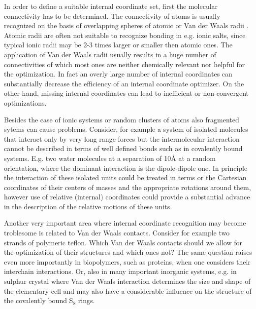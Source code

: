 \documentclass[prl,aps,preprint,superbib,12pt]{revtex4}
\begin{document}
In order to define a suitable internal coordinate set, first
the molecular connectivity has to be determined.
The connectivity of atoms is usually recognized on the basis of 
overlapping spheres of atomic or Van der Waals radii 
\cite{VBakken02,TBucko05,KNemeth04}. Atomic radii are often not suitable
to recognize bonding in e.g. ionic salts, since typical ionic radii
may be 2-3 times larger or smaller then atomic ones. The application
of Van der Waals radii usually results in a huge number of 
connectivities of which most ones are neither chemically relevant nor 
helpful for the optimization. In fact an overly large number
of internal coordinates can substantially decrease the efficiency of
an internal coordinate optimizer. On the other hand, missing internal 
coordinates can lead to inefficient or non-convergent optimizations.

Besides the case of ionic systems or random clusters of atoms
also fragmented sytems can cause problems. Consider, for example
a system of isolated molecules that interact only by very long range
forces but the intermolecular interaction cannot be described
in terms of well defined bonds such as in covalently bound systems.
E.g. two water molecules at a separation of 10{\AA} at a random 
orientation, where the dominant interaction is the dipole-dipole one.
In principle the interaction of these isolated units could be treated
in terms or the Cartesian coordinates of their centers of masses
and the appropriate rotations around them, however use of 
relative (internal) coordinates could provide a substantial advance
in the description of the relative motions of these units.

Another very important area where internal coordinate recognition
may become troblesome is related to Van der Waals contacts.
Consider for example two strands of polymeric teflon. Which 
Van der Waals contacts should we allow for the optimization of their
structures and which ones not? The same question raises even more
importantly in biopolymers, such as proteins, when one considers
their interchain interactions. Or, also in many important
inorganic systems, e.g. in sulphur crystal where Van der Waals 
interaction determines the size and shape of the elementary cell and
may also have a considerable influence on the structure of the
covalently bound S$_{8}$ rings.
\end{document}
